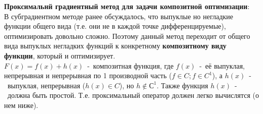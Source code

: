 \textbf{Проксимальнй градиентный метод для задачи композитной оптимизации}:\\
В субградиентном методе ранее обсуждалось, что выпуклые но негладкие функции общего вида (т.е. они не в каждой точке дифференцируемые), оптимизировать довольно сложно. Поэтому данный метод переходит от общего вида выпуклых негладких функций к конкретному \textbf{композитному виду функции}, который и оптимизирует.\\

$F(x)=f(x)+h(x)$~-~композитная функция, где $f(x)$~-~её выпуклая, непрерывная и непрерывная по 1 производной часть ($f \in C; f \in C^1$), а $h(x)$~-~выпуклая, непрерывная ($h(x) \in C$), но $h \not\in С^1$. Также функция $h(x)$~-~должна быть простой. Т.е. проксимальный оператор должен легко вычислятся (о нем ниже).\\

